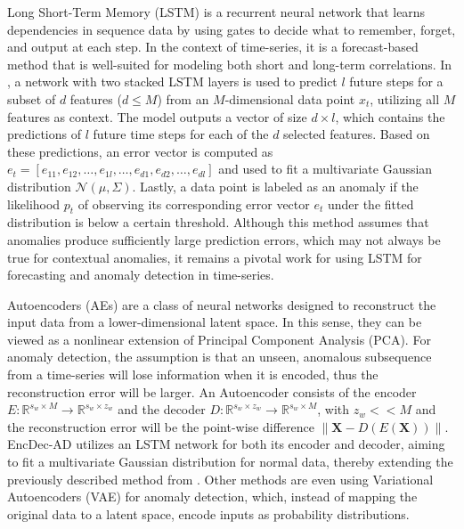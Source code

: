 Long Short-Term Memory (LSTM) \cite{hochreiter1997lstm} is a recurrent neural network that learns dependencies in sequence data by using gates to decide what to remember, forget, and output at each step. In the context of time-series, it is a forecast-based method that is well-suited for modeling both short and long-term correlations. In \cite{malhotra2015lstm-ad}, a network with two stacked LSTM layers is used to predict $l$ future steps for a subset of $d$ features ($d \le M$) from an $M$-dimensional data point $x_t$, utilizing all $M$ features as context. The model outputs a vector of size $d \times l$, which contains the predictions of $l$ future time steps for each of the $d$ selected features. Based on these predictions, an error vector is computed as $e_t = [e_{11}, e_{12}, \ldots, e_{1l}, \ldots, e_{d1}, e_{d2}, \ldots, e_{dl}]$ and used to fit a multivariate Gaussian distribution $\mathcal{N}(\mu, \Sigma)$. Lastly, a data point is labeled as an anomaly if the likelihood $p_t$ of observing its corresponding error vector $e_t$ under the fitted distribution is below a certain threshold. Although this method assumes that anomalies produce sufficiently large prediction errors, which may not always be true for contextual anomalies, it remains a pivotal work for using LSTM for forecasting and anomaly detection in time-series.

Autoencoders (AEs) are a class of neural networks designed to reconstruct the input data from a lower-dimensional latent space. In this sense, they can be viewed as a nonlinear extension of Principal Component Analysis (PCA). For anomaly detection, the assumption is that an unseen, anomalous subsequence from a time-series will lose information when it is encoded, thus the reconstruction error will be larger. An Autoencoder consists of the encoder $E: \mathbb{R}^{s_w \times M} \to \mathbb{R}^{s_w \times z_w}$ and the decoder $D: \mathbb{R}^{s_w \times z_w} \to \mathbb{R}^{s_w \times M}$, with $z_w << M$ and the reconstruction error will be the point-wise difference $\|\textbf{X} - D(E(\textbf{X}))\|$. EncDec-AD \cite{malhotra2016lstm-enc-dec-ad} utilizes an LSTM network for both its encoder and decoder, aiming to fit a multivariate Gaussian distribution for normal data, thereby extending the previously described method from \cite{malhotra2015lstm-ad}. Other methods \cite{solch2016storn} \cite{park2018lstm-vae-ad} are even using Variational Autoencoders (VAE) for anomaly detection, which, instead of mapping the original data to a latent space, encode inputs as probability distributions.

